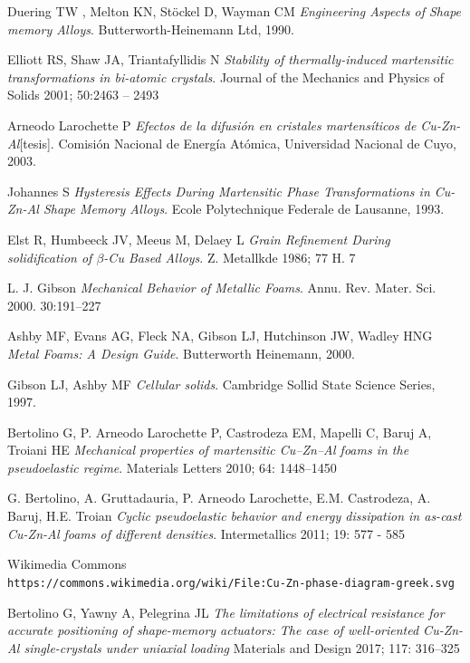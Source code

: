 \documentclass[a4paper,12pt,fleqn,twoside,openany]{book}
\begin{document}
\backmatter
\cleardoublepage
\begin{thebibliography}{3}

Duering TW , Melton KN, St{\"o}ckel D, Wayman CM
\textit{Engineering Aspects of Shape memory Alloys}. 
Butterworth-Heinemann Ltd, 1990.
 
Elliott RS, Shaw JA, Triantafyllidis N
\textit{Stability of thermally-induced martensitic
transformations in bi-atomic crystals}.
Journal of the Mechanics and Physics of Solids
2001; 50:2463 – 2493

Arneodo Larochette P
\textit{Efectos de la difusión en cristales martensíticos de Cu-Zn-Al}[tesis]. 
Comisión Nacional de Energía Atómica, Universidad Nacional de Cuyo, 2003.

Johannes S
\textit{Hysteresis Effects During Martensitic Phase Transformations in Cu-Zn-Al Shape Memory Alloys}. 
Ecole Polytechnique Federale de Lausanne, 1993.

Elst R, Humbeeck JV, Meeus M, Delaey L
\textit{Grain Refinement During solidification of $\beta$-Cu Based Alloys}.
Z. Metallkde 1986; 77 H. 7

L. J. Gibson
\textit{Mechanical Behavior of Metallic Foams}.
Annu. Rev. Mater. Sci. 2000. 30:191–227

Ashby MF, Evans AG, Fleck NA, Gibson LJ, Hutchinson JW, Wadley HNG
\textit{Metal Foams: A Design Guide}. 
Butterworth Heinemann, 2000.

Gibson LJ, Ashby MF
\textit{Cellular solids}. 
Cambridge Sollid State Science Series, 1997.

Bertolino G, P. Arneodo Larochette P, Castrodeza EM, Mapelli C, Baruj A, Troiani HE
\textit{Mechanical properties of martensitic Cu–Zn–Al foams in the pseudoelastic regime}.
Materials Letters 2010; 64: 1448–1450

G. Bertolino, A. Gruttadauria, P. Arneodo Larochette, E.M. Castrodeza, A. Baruj, H.E. Troian
\textit{Cyclic pseudoelastic behavior and energy dissipation in as-cast Cu-Zn-Al foams of
different densities}.
Intermetallics 2011; 19: 577 - 585

Wikimedia Commons
\\\texttt{https://commons.wikimedia.org/wiki/File:Cu-Zn-phase-diagram-greek.svg}


Bertolino G, Yawny A, Pelegrina JL
\textit{The limitations of electrical resistance for accurate positioning of
shape-memory actuators: The case of well-oriented Cu-Zn-Al
single-crystals under uniaxial loading}
Materials and Design 2017; 117: 316–325
\end{thebibliography}
\end{document}
